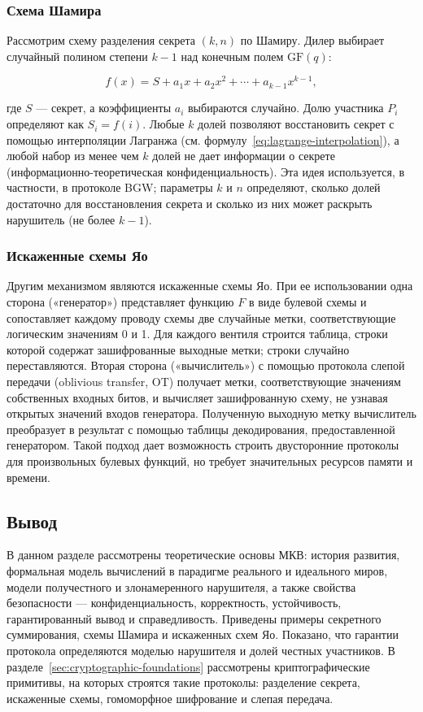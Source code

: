 \subsubsection{Схема Шамира}

Рассмотрим схему разделения секрета \((k,n)\) по Шамиру. Дилер выбирает случайный полином степени \(k-1\) над конечным полем \(\mathrm{GF}(q)\):

\begin{equation}
f(x)=S+a_{1}x+a_{2}x^{2}+\cdots+a_{k-1}x^{k-1},
\end{equation}

где \(S\) --- секрет, а коэффициенты \(a_{i}\) выбираются случайно. Долю участника \(P_{i}\) определяют как \(S_{i}=f(i)\). Любые \(k\) долей позволяют восстановить секрет с помощью интерполяции Лагранжа (см. формулу~\eqref{eq:lagrange-interpolation}), а любой набор из менее чем \(k\) долей не дает информации о секрете (информационно-теоретическая конфиденциальность). Эта идея используется, в частности, в протоколе BGW; параметры \(k\) и \(n\) определяют, сколько долей достаточно для восстановления секрета и сколько из них может раскрыть нарушитель (не более \(k-1\)).

\subsubsection{Искаженные схемы Яо}

Другим механизмом являются искаженные схемы Яо. При ее использовании одна сторона («генератор») представляет функцию \(F\) в виде булевой схемы и сопоставляет каждому проводу схемы две случайные метки, соответствующие логическим значениям 0 и 1. Для каждого вентиля строится таблица, строки которой содержат зашифрованные выходные метки; строки случайно переставляются. Вторая сторона («вычислитель») с помощью протокола слепой передачи (oblivious transfer, OT) получает метки, соответствующие значениям собственных входных битов, и вычисляет зашифрованную схему, не узнавая открытых значений входов генератора. Полученную выходную метку вычислитель преобразует в результат с помощью таблицы декодирования, предоставленной генератором. Такой подход дает возможность строить двусторонние протоколы для произвольных булевых функций, но требует значительных ресурсов памяти и времени.

\subsection{Вывод}

В данном разделе рассмотрены теоретические основы МКВ: история развития, формальная модель вычислений в парадигме реального и идеального миров, модели получестного и злонамеренного нарушителя, а также свойства безопасности --- конфиденциальность, корректность, устойчивость, гарантированный вывод и справедливость. Приведены примеры секретного суммирования, схемы Шамира и искаженных схем Яо. Показано, что гарантии протокола определяются моделью нарушителя и долей честных участников. В разделе~\ref{sec:cryptographic-foundations} рассмотрены криптографические примитивы, на которых строятся такие протоколы: разделение секрета, искаженные схемы, гомоморфное шифрование и слепая передача.